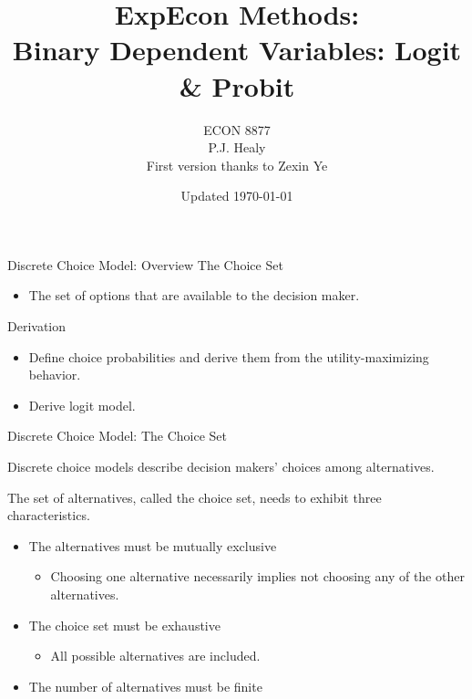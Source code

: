 

\title[Regressions 3]{ExpEcon Methods:\\Binary Dependent Variables: Logit \& Probit}
\author[ECON 8877]{ECON 8877\\P.J. Healy\\First version thanks to Zexin Ye} \color{metrop}
\institute[OSU]{}
\date[]{\vfill {\tiny Updated \today}}



\frame{\maketitle}


\begin{frame}{Discrete Choice Model: Overview}
The Choice Set
\begin{itemize}
\item The set of options that are available to the decision maker.
\end{itemize}

Derivation
\begin{itemize}
\item Define choice probabilities and derive them from the utility-maximizing behavior.
\item Derive logit model.
\end{itemize}

\end{frame}







\begin{frame}{Discrete Choice Model: The Choice Set}

Discrete choice models describe decision makers’ choices among alternatives. 

The set of alternatives, called the choice set, needs to exhibit three characteristics.
\begin{itemize}
\item The alternatives must be mutually exclusive
    \begin{itemize}
    \item Choosing one alternative necessarily implies not choosing any of the other alternatives.
    \end{itemize}
\item The choice set must be exhaustive
    \begin{itemize}
    \item All possible alternatives are included.
    \end{itemize}
\item The number of alternatives must be finite

\end{itemize}

\hspace*{\fill} 

\end{frame}



